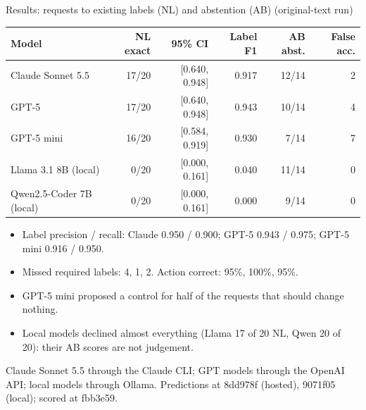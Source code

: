 \documentclass[10pt]{beamer}
\newcommand{\toprule}{\hline}
\newcommand{\midrule}{\hline}
\newcommand{\bottomrule}{\hline}
\newcommand{\src}[1]{\vfill{\tiny\color{bcitgray}#1}}
\begin{document}
\begin{frame}{Results: requests to existing labels (NL) and abstention (AB) (original-text run)}
\footnotesize
\begin{tabular}{@{}lrrrrr@{}}
\toprule
Model & NL exact & 95\% CI & Label F1 & AB abst. & False acc.\\\midrule
Claude Sonnet 5.5 & 17/20 & [0.640, 0.948] & 0.917 & 12/14 & 2\\
GPT-5 & 17/20 & [0.640, 0.948] & 0.943 & 10/14 & 4\\
GPT-5 mini & 16/20 & [0.584, 0.919] & 0.930 & 7/14 & 7\\
Llama 3.1 8B (local) & 0/20 & [0.000, 0.161] & 0.040 & 11/14 & 0\\
Qwen2.5-Coder 7B (local) & 0/20 & [0.000, 0.161] & 0.000 & 9/14 & 0\\
\bottomrule
\end{tabular}\par
\vspace{0.3cm}
\begin{itemize}
\item Label precision / recall: Claude 0.950 / 0.900; GPT-5 0.943 / 0.975; GPT-5 mini 0.916 / 0.950.
\item Missed required labels: 4, 1, 2. Action correct: 95\%, 100\%, 95\%.
\item GPT-5 mini proposed a control for half of the requests that should change nothing.
\item Local models declined almost everything (Llama 17 of 20 NL, Qwen 20 of 20): their AB scores are not judgement.
\end{itemize}
\src{Claude Sonnet 5.5 through the Claude CLI; GPT models through the OpenAI API; local models through Ollama. Predictions at 8dd978f (hosted), 9071f05 (local); scored at fbb3e59.}
\end{frame}
\end{document}
